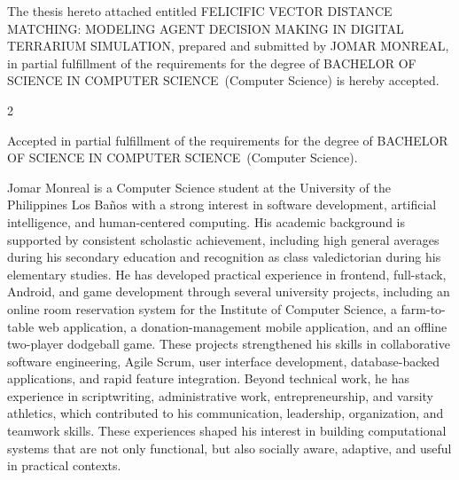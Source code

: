 \documentclass{icsthesis}
\renewcommand{\TITLE}{FELICIFIC VECTOR DISTANCE MATCHING: \mbox{MODELING} AGENT DECISION MAKING IN DIGITAL TERRARIUM SIMULATION}
\renewcommand{\AUTHOR}{JOMAR MONREAL}
\renewcommand{\DEGREE}{BACHELOR OF SCIENCE IN COMPUTER SCIENCE}
\renewcommand{\MAJOR}{Computer Science}
\begin{document}
	
	\begin{frontmatter}
		\maketitle
				
		\begin{approvalpage}
			The thesis hereto attached entitled \TITLE , prepared and submitted by \AUTHOR , in partial fulfillment of the requirements for the degree of \DEGREE\ (\MAJOR) is hereby accepted.
			
			\begin{multicols}{2}
				\centering
				\columnbreak
			\end{multicols}
			
			Accepted in partial fulfillment of the requirements for the degree of \DEGREE\ (\MAJOR). 
		\end{approvalpage}
		
		\begin{biosketch}
Jomar Monreal is a Computer Science student at the University of the Philippines Los Baños with a strong interest in software development, artificial intelligence, and human-centered computing. His academic background is supported by consistent scholastic achievement, including high general averages during his secondary education and recognition as class valedictorian during his elementary studies. He has developed practical experience in frontend, full-stack, Android, and game development through several university projects, including an online room reservation system for the Institute of Computer Science, a farm-to-table web application, a donation-management mobile application, and an offline two-player dodgeball game. These projects strengthened his skills in collaborative software engineering, Agile Scrum, user interface development, database-backed applications, and rapid feature integration. Beyond technical work, he has experience in scriptwriting, administrative work, entrepreneurship, and varsity athletics, which contributed to his communication, leadership, organization, and teamwork skills. These experiences shaped his interest in building computational systems that are not only functional, but also socially aware, adaptive, and useful in practical contexts. 		
			

\end{biosketch}
\end{frontmatter}
\end{document}
